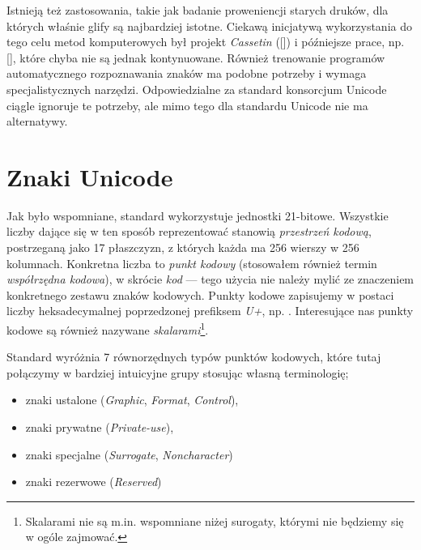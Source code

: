 Istnieją też zastosowania, takie jak badanie proweniencji starych
druków, dla których właśnie glify są najbardziej istotne.  Ciekawą
inicjatywą wykorzystania do tego celu metod komputerowych był projekt
\textit{Cassetin} ([\cite{Cassetin2003}]) i późniejsze prace, np.
[\cite{andre:halshs-00983575}], które chyba nie są jednak
kontynuowane.
%
%
Również trenowanie programów automatycznego rozpoznawania znaków ma
podobne potrzeby i wymaga specjalistycznych narzędzi. Odpowiedzialne
za standard konsorcjum Unicode ciągle ignoruje te potrzeby, ale mimo
tego dla standardu Unicode nie ma  alternatywy.

\section{Znaki Unicode}
\label{sec:znaki-unicode-i}




Jak było wspomniane, standard wykorzystuje jednostki
21-bitowe. Wszystkie liczby dające się w ten sposób reprezentować
stanowią \textit{przestrzeń kodową}, postrzeganą jako 17 płaszczyzn, z
których każda ma 256 wierszy w 256 kolumnach. Konkretna liczba to
\textit{punkt kodowy} (stosowałem również termin \textit{współrzędna
  kodowa}), w skrócie \textit{kod} --- tego użycia nie należy mylić ze
znaczeniem konkretnego zestawu znaków kodowych. Punkty kodowe
zapisujemy w postaci liczby heksadecymalnej poprzedzonej prefiksem
\textit{U+}, np. . Interesujące nas punkty kodowe są
również nazywane \textit{skalarami}\footnote{Skalarami nie są
  m.in. wspomniane niżej surogaty, którymi nie będziemy się w ogóle
  zajmować.}.



Standard wyróżnia 7 równorzędnych typów punktów kodowych, które tutaj
połączymy w bardziej intuicyjne grupy stosując własną terminologię;
\begin{itemize}
\item znaki ustalone (\textit{Graphic}, \textit{Format}, \textit{Control}),
\item znaki prywatne (\textit{Private-use}),
\item znaki specjalne (\textit{Surrogate},
  \textit{Noncharacter})
\item znaki rezerwowe (\textit{Reserved})
\end{itemize}

